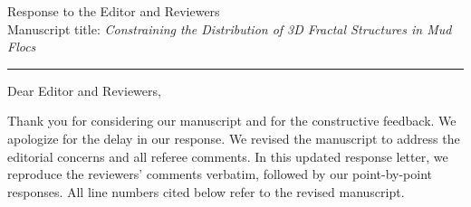 \documentclass[11pt]{article}
\begin{document}
\begin{center}
{\Large Response to the Editor and Reviewers}\\[0.5em]
Manuscript title: \emph{Constraining the Distribution of 3D Fractal Structures in Mud Flocs}
\end{center}
\hrule
\vspace{0.8em}

Dear Editor and Reviewers,

Thank you for considering our manuscript and for the constructive feedback. We apologize for the delay in our response. We revised the manuscript to address the editorial concerns and all referee comments. In this updated response letter, we reproduce the reviewers' comments verbatim, followed by our point-by-point responses. All line numbers cited below refer to the revised manuscript.
\end{document}
